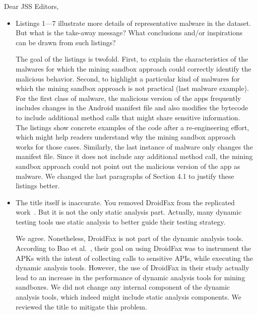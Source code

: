 \documentclass[12pt,english]{scrartcl}
\begin{document}
\begin{letter}{Dear JSS Editors,}
\begin{itemize}
\vspace{0.2cm}

\item Listings 1---7 illustrate more details of representative malware in the dataset. But what is the take-away message? What 
conclusions and/or inspirations can be drawn from such listings?


\vspace{0.2cm}

{\color{blue}{\bf Answer.}The goal of the listings is twofold. First, to explain the characteristics of the malwares for which the mining sandbox approach could correctly identify the malicious behavior. Second, to highlight a particular kind of malwares for which the mining sandbox approach is not practical (last malware example). For the first class of malware, the malicious version of the apps frequently includes changes in the Android manifest file and also modifies the bytecode to include additional method calls that might share sensitive information. The listings show concrete examples of the code after a re-engineering effort, which might help readers understand why the mining sandbox approach works for those cases. Similarly, the last instance of malware only changes the manifest file. Since it does not include any additional method call, the mining sandbox approach could not point out the malicious version of the app as malware. We changed the last paragraphs of Section 4.1 to justify these listings better.
}

\vspace{0.2cm}

\item The title itself is inaccurate. You removed DroidFax from the replicated work~\cite{DBLP:conf/wcre/BaoLL18}.
  But it is not the only static analysis part. Actually, many dynamic testing tools use
  static analysis to better guide their testing strategy.


\vspace{0.2cm}

{\color{blue}{\bf Answer.} We agree. Nonetheless, DroidFax is not part of the dynamic analysis tools. According to Bao et al.~\cite{jamrozikZ16}, their goal on using DroidFax was to instrument the APKs with the intent of collecting calls to sensitive APIs, while executing the dynamic analysis tools. However, the use of DroidFax in their study actually lead to an increase in the performance of dynamic analysis tools for mining sandboxes. We did not change any internal component of the dynamic analysis tools, which indeed might include static analysis components. We reviewed the title to mitigate this problem.}



\end{itemize}
\end{letter}
\end{document}
